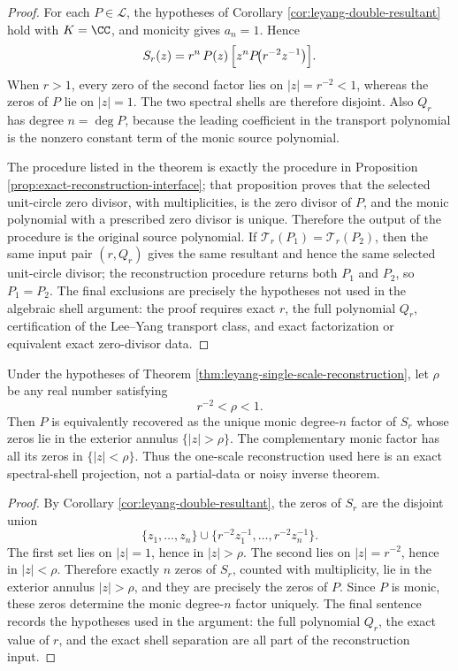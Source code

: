 \begin{proof}
For each \(P\in\mathcal L\), the hypotheses of Corollary \ref{cor:leyang-double-resultant} hold with \(K=\CC\), and monicity gives \(a_n=1\).  Hence
\[
S_r(z)=r^n\,P(z)\,\Bigl[z^nP\!\bigl(r^{-2}z^{-1}\bigr)\Bigr].
\]
When \(r>1\), every zero of the second factor lies on \(|z|=r^{-2}<1\), whereas the zeros of \(P\) lie on \(|z|=1\). The two spectral shells are therefore disjoint.  Also \(Q_r\) has degree \(n=\deg P\), because the leading coefficient in the transport polynomial is the nonzero constant term of the monic source polynomial.

The procedure listed in the theorem is exactly the procedure in Proposition \ref{prop:exact-reconstruction-interface}; that proposition proves that the selected unit-circle zero divisor, with multiplicities, is the zero divisor of \(P\), and the monic polynomial with a prescribed zero divisor is unique.  Therefore the output of the procedure is the original source polynomial.  If \(\mathcal T_r(P_1)=\mathcal T_r(P_2)\), then the same input pair \((r,Q_r)\) gives the same resultant and hence the same selected unit-circle divisor; the reconstruction procedure returns both \(P_1\) and \(P_2\), so \(P_1=P_2\).  The final exclusions are precisely the hypotheses not used in the algebraic shell argument: the proof requires exact \(r\), the full polynomial \(Q_r\), certification of the Lee--Yang transport class, and exact factorization or equivalent exact zero-divisor data.
\end{proof}

\begin{corollary}\label{cor:leyang-annular-shell-projection}
Under the hypotheses of Theorem \ref{thm:leyang-single-scale-reconstruction}, let \(\rho\) be any real number satisfying
\[
r^{-2}<\rho<1.
\]
Then \(P\) is equivalently recovered as the unique monic degree-\(n\) factor of \(S_r\) whose zeros lie in the exterior annulus \(\{|z|>\rho\}\). The complementary monic factor has all its zeros in \(\{|z|<\rho\}\). Thus the one-scale reconstruction used here is an exact spectral-shell projection, not a partial-data or noisy inverse theorem.
\end{corollary}

\begin{proof}
By Corollary \ref{cor:leyang-double-resultant}, the zeros of \(S_r\) are the disjoint union
\[
\{z_1,
\dots,z_n\}\cup\{r^{-2}z_1^{-1},\dots,r^{-2}z_n^{-1}\}.
\]
The first set lies on \(|z|=1\), hence in \(|z|>\rho\). The second lies on \(|z|=r^{-2}\), hence in \(|z|<\rho\). Therefore exactly \(n\) zeros of \(S_r\), counted with multiplicity, lie in the exterior annulus \(|z|>\rho\), and they are precisely the zeros of \(P\). Since \(P\) is monic, these zeros determine the monic degree-\(n\) factor uniquely. The final sentence records the hypotheses used in the argument: the full polynomial \(Q_r\), the exact value of \(r\), and the exact shell separation are all part of the reconstruction input.
\end{proof}
